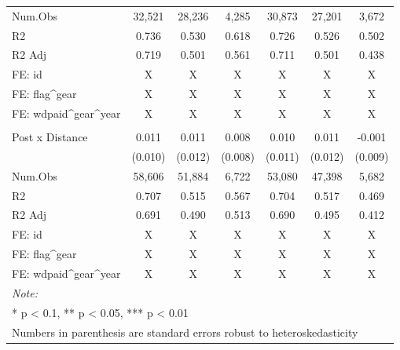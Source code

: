 \begin{table}
\begin{tabular}[t]{lcccccc}
\hspace{1em}Num.Obs & 32,521 & 28,236 & 4,285 & 30,873 & 27,201 & 3,672\\
\hspace{1em}R2 & 0.736 & 0.530 & 0.618 & 0.726 & 0.526 & 0.502\\
\hspace{1em}R2 Adj & 0.719 & 0.501 & 0.561 & 0.711 & 0.501 & 0.438\\
\hspace{1em}FE: id & X & X & X & X & X & \vphantom{1} X\\
\hspace{1em}FE: flag\textasciicircum{}gear & X & X & X & X & X & \vphantom{1} X\\
\hspace{1em}FE: wdpaid\textasciicircum{}gear\textasciicircum{}year & X & X & X & X & X & \vphantom{1} X\\
\addlinespace[0.5cm]
\multicolumn{7}{l}{Panel C: 0-600 nautical miles}\\
\hline
\hspace{1em}Post x Distance & 0.011 & 0.011 & 0.008 & 0.010 & 0.011 & -0.001\\
\hspace{1em} & (0.010) & (0.012) & (0.008) & (0.011) & (0.012) & (0.009)\\
\hspace{1em}Num.Obs & 58,606 & 51,884 & 6,722 & 53,080 & 47,398 & 5,682\\
\hspace{1em}R2 & 0.707 & 0.515 & 0.567 & 0.704 & 0.517 & 0.469\\
\hspace{1em}R2 Adj & 0.691 & 0.490 & 0.513 & 0.690 & 0.495 & 0.412\\
\hspace{1em}FE: id & X & X & X & X & X & X\\
\hspace{1em}FE: flag\textasciicircum{}gear & X & X & X & X & X & X\\
\hspace{1em}FE: wdpaid\textasciicircum{}gear\textasciicircum{}year & X & X & X & X & X & X\\
\bottomrule
\multicolumn{7}{l}{\rule{0pt}{1em}\textit{Note: }}\\
\multicolumn{7}{l}{\rule{0pt}{1em}* p < 0.1, ** p < 0.05, *** p < 0.01}\\
\multicolumn{7}{l}{\rule{0pt}{1em}Numbers in parenthesis are standard errors robust to heteroskedasticity}\\

\end{tabular}
\end{table}
